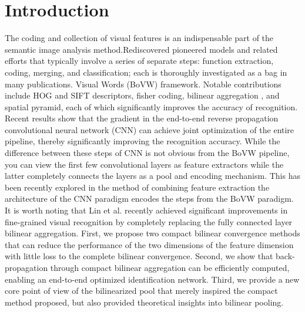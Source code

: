 \documentclass[10pt,twocolumn,letterpaper]{article}
\begin{document}
\section{Introduction}
The coding and collection of visual features is an indispensable part of the semantic image analysis method.Rediscovered pioneered models and related efforts that typically involve a series of separate steps: function extraction, coding, merging, and classification; each is thoroughly investigated as a bag in many publications. Visual Words (BoVW) framework. Notable contributions include HOG\cite{Dalal_2005_Histograms} and SIFT descriptors, fisher coding, bilinear aggregation , and spatial pyramid, each of which significantly improves the accuracy of recognition. Recent results show that the gradient in the end-to-end reverse propagation convolutional neural network (CNN) can achieve joint optimization of the entire pipeline, thereby significantly improving the recognition accuracy. While the difference between these steps of CNN is not obvious from the BoVW pipeline, you can view the first few convolutional layers as feature extractors while the latter completely connects the layers as a pool and encoding mechanism. This has been recently explored in the method of combining feature extraction the architecture of the CNN paradigm encodes the steps from the BoVW paradigm. It is worth noting that Lin et al. recently achieved significant improvements in fine-grained visual recognition by completely replacing the fully connected layer bilinear aggregation. First, we propose two compact bilinear convergence methods that can reduce the performance of the two dimensions of the feature dimension with little loss to the complete bilinear convergence. Second, we show that back-propagation through compact bilinear aggregation can be efficiently computed, enabling an end-to-end optimized identification network. Third, we provide a new core point of view of the bilinearized pool that merely inspired the compact method proposed, but also provided theoretical insights into bilinear pooling.
\end{document}
